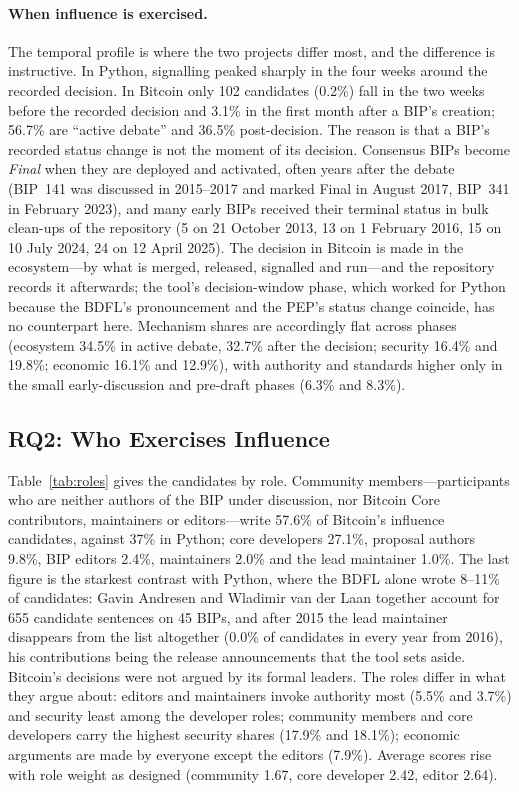 \documentclass[sigconf,screen]{acmart}
\begin{document}
\paragraph{When influence is exercised.} The temporal profile is where the two projects differ most, and the difference is instructive. In Python, signalling peaked sharply in the four weeks around the recorded decision. In Bitcoin only 102 candidates (0.2\%) fall in the two weeks before the recorded decision and 3.1\% in the first month after a BIP's creation; 56.7\% are ``active debate'' and 36.5\% post-decision. The reason is that a BIP's recorded status change is not the moment of its decision. Consensus BIPs become \emph{Final} when they are deployed and activated, often years after the debate (BIP~141 was discussed in 2015--2017 and marked Final in August 2017, BIP~341 in February 2023), and many early BIPs received their terminal status in bulk clean-ups of the repository (5 on 21 October 2013, 13 on 1 February 2016, 15 on 10 July 2024, 24 on 12 April 2025). The decision in Bitcoin is made in the ecosystem---by what is merged, released, signalled and run---and the repository records it afterwards; the tool's decision-window phase, which worked for Python because the BDFL's pronouncement and the PEP's status change coincide, has no counterpart here. Mechanism shares are accordingly flat across phases (ecosystem 34.5\% in active debate, 32.7\% after the decision; security 16.4\% and 19.8\%; economic 16.1\% and 12.9\%), with authority and standards higher only in the small early-discussion and pre-draft phases (6.3\% and 8.3\%).

\subsection{RQ2: Who Exercises Influence}

Table~\ref{tab:roles} gives the candidates by role. Community members---participants who are neither authors of the BIP under discussion, nor Bitcoin Core contributors, maintainers or editors---write 57.6\% of Bitcoin's influence candidates, against 37\% in Python; core developers 27.1\%, proposal authors 9.8\%, BIP editors 2.4\%, maintainers 2.0\% and the lead maintainer 1.0\%. The last figure is the starkest contrast with Python, where the BDFL alone wrote 8--11\% of candidates: Gavin Andresen and Wladimir van der Laan together account for 655 candidate sentences on 45 BIPs, and after 2015 the lead maintainer disappears from the list altogether (0.0\% of candidates in every year from 2016), his contributions being the release announcements that the tool sets aside. Bitcoin's decisions were not argued by its formal leaders. The roles differ in what they argue about: editors and maintainers invoke authority most (5.5\% and 3.7\%) and security least among the developer roles; community members and core developers carry the highest security shares (17.9\% and 18.1\%); economic arguments are made by everyone except the editors (7.9\%). Average scores rise with role weight as designed (community 1.67, core developer 2.42, editor 2.64).
\end{document}
